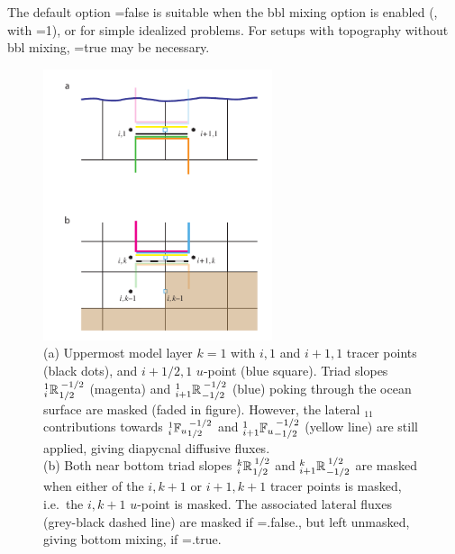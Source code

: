 The default option =false is suitable when the
bbl mixing option is enabled (, with =1),
or  for simple idealized  problems. For setups with topography without
bbl mixing, =true may be necessary.
\begin{figure}[h] \begin{center}
    \includegraphics[width=0.60\textwidth]{./TexFiles/Figures/Fig_GRIFF_bdry_triads}
    \caption{  \label{fig:triad:bdry_triads}
      (a) Uppermost model layer $k=1$ with $i,1$ and $i+1,1$ tracer
      points (black dots), and $i+1/2,1$ $u$-point (blue square). Triad
      slopes $\triad{i}{1}{R}{1/2}{-1/2}$ (magenta) and $\triad{i+1}{1}{R}{-1/2}{-1/2}$
      (blue) poking through the ocean surface are masked (faded in
      figure). However, the lateral $_{11}$ contributions towards
      $\triad[u]{i}{1}{F}{1/2}{-1/2}$ and $\triad[u]{i+1}{1}{F}{-1/2}{-1/2}$
      (yellow line) are still applied, giving diapycnal diffusive
      fluxes.\\
      (b) Both near bottom triad slopes $\triad{i}{k}{R}{1/2}{1/2}$ and
      $\triad{i+1}{k}{R}{-1/2}{1/2}$ are masked when either of the $i,k+1$
      or $i+1,k+1$ tracer points is masked, i.e.\ the $i,k+1$ $u$-point
      is masked. The associated lateral fluxes (grey-black dashed
      line) are masked if =.false., but left
      unmasked, giving bottom mixing, if =.true.}
 \end{center} \end{figure}
